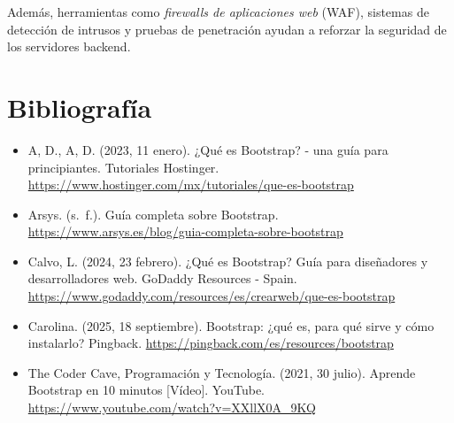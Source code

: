 \documentclass[11pt]{scrartcl}
\begin{document}
Además, herramientas como \textit{firewalls de aplicaciones web} (WAF), sistemas de detección de intrusos y pruebas de penetración ayudan a reforzar la seguridad de los servidores backend.


    \section{Bibliografía}

\begin{itemize}
    \item  A, D.,  A, D. (2023, 11 enero). ¿Qué es Bootstrap? - una guía para principiantes. Tutoriales Hostinger. \url{https://www.hostinger.com/mx/tutoriales/que-es-bootstrap} 
    \item Arsys. (s. f.). Guía completa sobre Bootstrap. \url{https://www.arsys.es/blog/guia-completa-sobre-bootstrap}
    \item Calvo, L. (2024, 23 febrero). ¿Qué es Bootstrap? Guía para diseñadores y desarrolladores web. GoDaddy Resources - Spain. \url{https://www.godaddy.com/resources/es/crearweb/que-es-bootstrap}
    \item Carolina. (2025, 18 septiembre). Bootstrap: ¿qué es, para qué sirve y cómo instalarlo? Pingback. \url{https://pingback.com/es/resources/bootstrap} 
    \item The Coder Cave, Programación y Tecnología. (2021, 30 julio). Aprende Bootstrap en 10 minutos [Vídeo]. YouTube. \url{https://www.youtube.com/watch?v=XXllX0A_9KQ}
\end{itemize}
    
\end{document}
